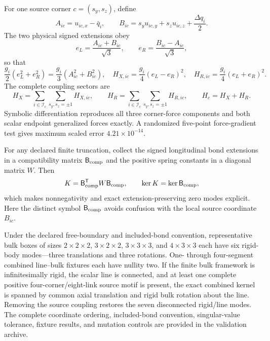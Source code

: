 \documentclass[10pt,aps,pre,onecolumn,notitlepage,nofootinbib]{revtex4-2}
\begin{document}
For one source corner $c=(s_y,s_z)$, define
\begin{equation}
 A_{ic}=u_{ic,x}-\bar q_i,
 \qquad
 B_{ic}=s_yu_{ic,y}+s_zu_{ic,z}+\frac{\Delta q_i}{2}.
\end{equation}
The two physical signed extensions obey
\begin{equation}
 e_L=\frac{A_{ic}+B_{ic}}{\sqrt3},
 \qquad
 e_R=\frac{B_{ic}-A_{ic}}{\sqrt3},
\end{equation}
so that
\begin{equation}
 \frac{g_i}{2}(e_L^2+e_R^2)=\frac{g_i}{3}(A_{ic}^2+B_{ic}^2),
 \quad
 H_{X,ic}=\frac{g_i}{4}(e_L-e_R)^2,
 \quad
 H_{R,ic}=\frac{g_i}{4}(e_L+e_R)^2.
\end{equation}
The complete coupling sectors are
\begin{equation}
 H_X=\sum_{i\in\mathcal I_c}\sum_{s_y,s_z=\pm1}H_{X,ic},
 \qquad
 H_R=\sum_{i\in\mathcal I_c}\sum_{s_y,s_z=\pm1}H_{R,ic},
 \qquad H_c=H_X+H_R.
\end{equation}
Symbolic differentiation reproduces all three corner-force components and both scalar endpoint generalized forces exactly. A randomized five-point force-gradient test gives maximum scaled error $4.21\times10^{-14}$.

For any declared finite truncation, collect the signed longitudinal bond extensions in a compatibility matrix $\mathsf B_{\rm comp}$ and the positive spring constants in a diagonal matrix $W$. Then
\begin{equation}
 K=\mathsf B_{\rm comp}^{\mathsf T}W\mathsf B_{\rm comp},
 \qquad
 \ker K=\ker\mathsf B_{\rm comp},
\end{equation}
which makes nonnegativity and exact extension-preserving zero modes explicit. Here the distinct symbol $\mathsf B_{\rm comp}$ avoids confusion with the local source coordinate $B_{ic}$.

Under the declared free-boundary and included-bond convention, representative bulk boxes of sizes $2\times2\times2$, $3\times2\times2$, $3\times3\times3$, and $4\times3\times3$ each have six rigid-body modes---three translations and three rotations. One- through four-segment combined line--bulk fixtures each have nullity two. If the finite bulk framework is infinitesimally rigid, the scalar line is connected, and at least one complete positive four-corner/eight-link source motif is present, the exact combined kernel is spanned by common axial translation and rigid bulk rotation about the line. Removing the source coupling restores the seven disconnected rigid/line modes. The complete coordinate ordering, included-bond convention, singular-value tolerance, fixture results, and mutation controls are provided in the validation archive.
\end{document}
